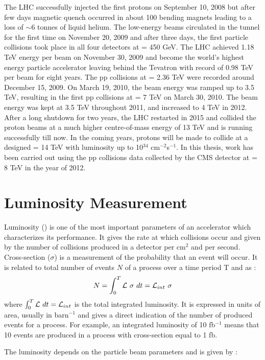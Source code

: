 The LHC successfully injected the first protons on September 10, 2008 but after few days magnetic quench occurred in about 100 bending magnets leading to a loss of $\sim$6 tonnes of liquid helium. The low-energy beams circulated in the tunnel for the first time on November 20, 2009 and after three days, the first particle collisions took place in all four detectors at \cme = 450 GeV. The LHC achieved 1.18 TeV energy per beam on November 30, 2009 and become the world’s highest energy particle accelerator leaving behind the Tevatron with record of 0.98 TeV per beam for eight years. The pp collisions at \cme = 2.36 TeV were recorded around December 15, 2009. On March 19, 2010, the beam energy was ramped up to 3.5 TeV, resulting in the first pp collisions at \cme = 7 TeV on March 30, 2010. The beam energy was kept at 3.5 TeV throughout 2011, and increased to 4 TeV in 2012. After a long shutdown for two years, the LHC restarted in 2015 and collided the proton beams at a much higher centre-of-mass energy of 13 TeV and is running successfully till now. In the coming years, protons will be made to collide at a designed \cme = 14 TeV with luminosity up to 10$^{34}$ cm$^{-2}$s$^{-1}$. In this thesis, work has been carried out using the pp collisions data collected by the CMS detector at \cme = 8 TeV in the year of 2012.

\section{Luminosity Measurement}
\label{sec:lumi}
Luminosity (\lumi) is one of the most important parameters of an accelerator which characterizes its performance. It gives the rate at which collisions occur and given by the number of collisions produced in a detector per cm$^2$ and per second. Cross-section ($\sigma$) is a measurement of the probability that an event will occur. It is related to total number of events $N$ of a process over a time period T and \lumi as :
\begin{equation}
N = \int_{0}^{T} \mathcal{L}~\sigma~dt = \mathcal{L}_{int}~\sigma
\end{equation}
where $\int_{0}^{T} \mathcal{L}~dt = \mathcal{L}_{int}$ is the total integrated luminosity. It is expressed in units of area, usually in barn$^{-1}$ and gives a direct indication of the number of produced events for a process. For example, an integrated luminosity of 10 fb$^{-1}$ means that 10 events are produced in a process with cross-section equal to 1 fb.

The luminosity depends on the particle beam parameters and is given by :

